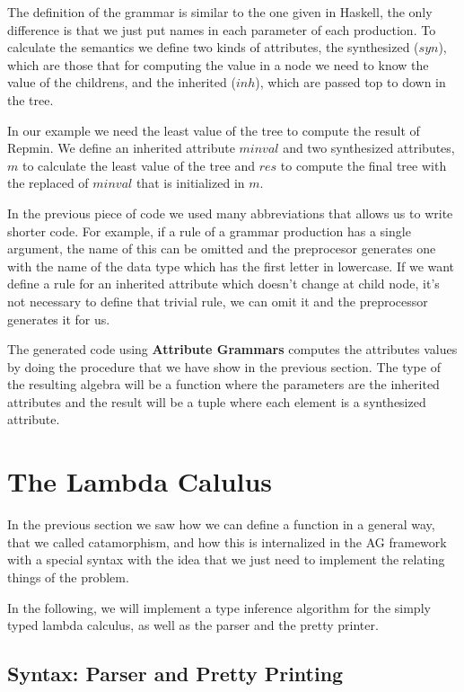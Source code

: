 \documentclass[a4paper,10pt]{article}
\begin{document}
The definition of the grammar is similar to the one given in Haskell, the only difference is that we 
just put names in each parameter of each production. To calculate the semantics we define two kinds of 
attributes, the synthesized ($syn$), which are those that for computing the value in a node we need to 
know the value of the childrens, and the inherited ($inh$), which are passed top to down in the tree.

In our example we need the least value of the tree to compute the result of Repmin. We define
an inherited attribute $minval$ and two synthesized attributes, $m$ to calculate the least value
of the tree and $res$ to compute the final tree with the replaced of $minval$ that is initialized
in $m$.
  
In the previous piece of code we used many abbreviations that allows us to write shorter code.
For example, if a rule of a grammar production has a single argument, the name of this can be omitted and the preprocesor generates 
one with the name of the data type which has the first letter in lowercase. 
If we want define a rule for an inherited attribute which doesn't change at child node, 
it's not necessary to define that trivial rule, we can omit it and the preprocessor generates it for us.

The generated code using \textbf{Attribute Grammars} computes the attributes values by doing the
procedure that we have show in the previous section. The type of the resulting algebra will be a function
where the parameters are the inherited attributes and the result will be a tuple where each element
is a synthesized attribute.
  
\section{The Lambda Calulus}

In the previous section we saw how we can define a function in a general way, that we called
catamorphism, and how this is internalized in the AG framework with a special syntax
with the idea that we just need to implement the relating things of the problem.

In the following, we will implement a type inference algorithm for the simply typed lambda
calculus, as well as the parser and the pretty printer.

\subsection{Syntax: Parser and Pretty Printing}
\end{document}
